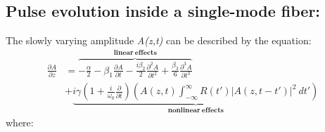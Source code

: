     \subsection{Pulse evolution inside a single-mode fiber:}
        The slowly varying amplitude \emph{A(z,t)} can be described by the equation:
        \begin{equation}\label{eq_a}
        \begin{split}
\frac{\partial A}{\partial z}&= \overbrace{-\frac{\alpha}{2} - \beta_1\frac{\partial A}{\partial t} - \frac{i \beta_2}{2} \frac{\partial^2 A}{\partial t^2} +\frac{\beta_3}{6} \frac{\partial^3 A}{\partial t^3}}^{\mathbf{linear \ effects}}\\  
            & +\underbrace{i \gamma \left( 1 + \frac{i}{\omega_0} \frac{\partial}{\partial t} \right) \left( A(z,t) \int_{-\infty}^{\infty} R(t') \left|A(z, t-t') \right|^2 \ dt'  \right)}_{\mathbf{nonlinear \ effects}}
        \end{split}
        \end{equation}
    where: 
